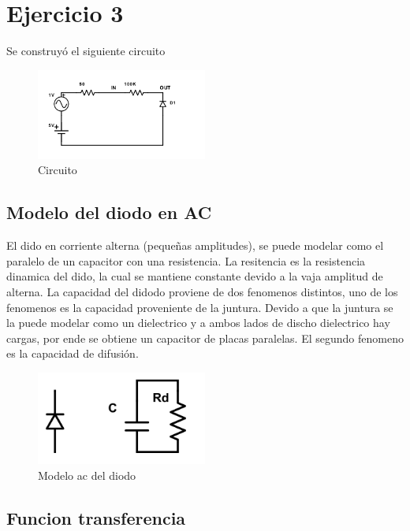 \documentclass[../../e1_tp1_main.tex]{subfiles}
\begin{document}
\chapter{Ejercicio 3}

Se construyó el siguiente circuito

\begin{figure}[H]
\centering
\includegraphics[width=0.5\textwidth]{imagenes/cirq.png}
\caption{Circuito}
\end{figure}


\section{Modelo del diodo en AC}

El dido en corriente alterna (pequeñas amplitudes), se puede modelar como el paralelo de un capacitor con una resistencia. La resitencia es la resistencia dinamica del dido, la cual se mantiene constante devido a la vaja amplitud de alterna. La capacidad del didodo proviene de dos fenomenos distintos, uno de los fenomenos es la capacidad proveniente de la juntura. Devido a que  la juntura se la puede modelar como un dielectrico y a ambos lados de discho dielectrico hay cargas, por ende se obtiene un capacitor de placas paralelas. El segundo fenomeno es la capacidad de difusión.

\begin{figure}[H]
\centering
\includegraphics[width=0.5\textwidth]{imagenes/modAc.png}
\caption{Modelo ac del diodo}
\end{figure}

\section{Funcion transferencia}
\end{document}
